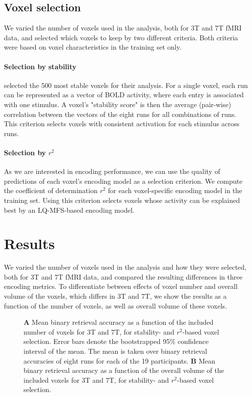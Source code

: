 \subsection*{Voxel selection}

We varied the number of voxels used in the analysis, both for 3T and 7T
f{MRI} data, and selected which voxels to keep by two different criteria. Both
criteria were based on voxel characteristics in the training set only.

\paragraph{Selection by stability}

\citet{ML08} selected the 500 most stable voxels for their analysis. For a
single voxel, each run can be represented as a vector of BOLD activity, where
each entry is associated with one stimulus. A voxel's "stability score" is then
the average (pair-wise) correlation between the vectors of the eight runs for
all combinations of runs.  This criterion selects voxels with consistent
activation for each stimulus across runs.

\paragraph{Selection by $r^2$}

As we are interested in encoding performance, we can use the quality of
predictions of each voxel's encoding model as a selection criterion. We compute
the coefficient of determination $r^2$ for each voxel-specific encoding model
in the training set. Using this criterion selects voxels whose activity can be
explained best by an LQ-MFS-based encoding model.

\section*{Results}

We varied the number of voxels used in the analysis and how they were selected,
both for 3T and 7T f{MRI} data, and compared the resulting differences in
three encoding metrics. To differentiate between effects of voxel number and
overall volume of the voxels, which differs in 3T and 7T, we show the
results as a function of the number of voxels, as well as overall volume of
these voxels.

\begin{figure}
  \centering
  \def\svgwidth{\linewidth}
  
	
  \caption{\textbf{A} Mean binary retrieval accuracy as a function of the
  included number of voxels for 3T and 7T, for stability- and $r^2$-based
  voxel selection. Error bars denote the bootstrapped 95\% confidence interval
  of the mean. The mean is taken over binary retrieval accuracies of eight runs
  for each of the 19 participants. \textbf{B} Mean binary retrieval accuracy as
a function of the overall volume of the included voxels for 3T and 7T, for
stability- and $r^2$-based voxel selection.
}

 \label{fig:binary_retrieval}
\end{figure}

